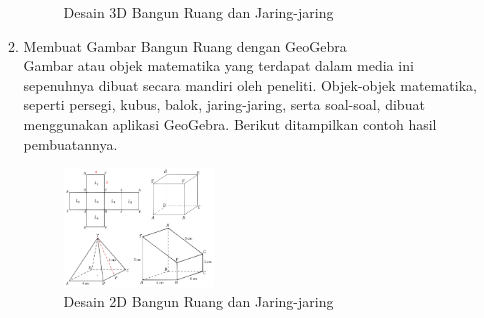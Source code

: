 \documentclass[12pt]{article}
\begin{document}
\begin{enumerate}[leftmargin=1cm, label=\arabic*.]
\begin{enumerate}[label=\arabic*)]
\begin{figure}[H]
            \caption{Desain 3D Bangun Ruang dan Jaring-jaring}
            \label{fig:bangundanjaring}
        \end{figure}
        \item Membuat Gambar Bangun Ruang dengan GeoGebra \\
        \hspace*{1cm}Gambar atau objek matematika yang terdapat dalam media ini sepenuhnya dibuat secara mandiri oleh peneliti. Objek-objek matematika, seperti persegi, kubus, balok, jaring-jaring, serta soal-soal, dibuat menggunakan aplikasi GeoGebra. Berikut ditampilkan contoh hasil pembuatannya.
        \begin{figure}[H]
            \centering
            \includegraphics[width=0.4\textwidth]{images/hasil-geogebra.png}
            \caption{Desain 2D Bangun Ruang dan Jaring-jaring}
            \label{fig:hasilgeogebra}
        \end{figure}
        

\end{enumerate}
\end{enumerate}
\end{document}
